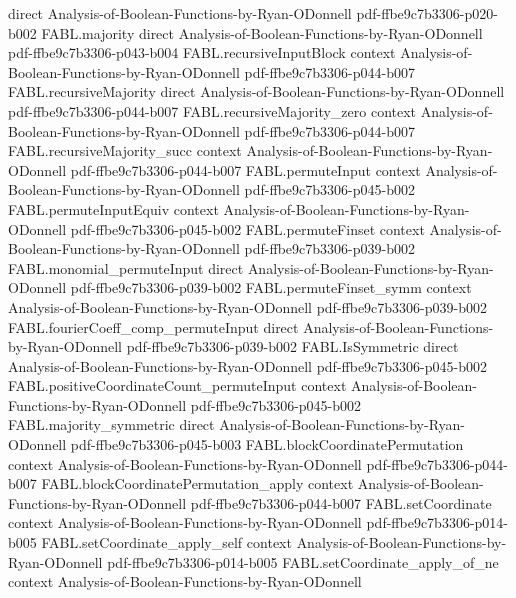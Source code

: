 \begin{theorem}
  {direct}
  {Analysis-of-Boolean-Functions-by-Ryan-ODonnell}
  {pdf-ffbe9c7b3306-p020-b002}
\proofstep
  {FABL.majority}
  {direct}
  {Analysis-of-Boolean-Functions-by-Ryan-ODonnell}
  {pdf-ffbe9c7b3306-p043-b004}
\proofstep
  {FABL.recursiveInputBlock}
  {context}
  {Analysis-of-Boolean-Functions-by-Ryan-ODonnell}
  {pdf-ffbe9c7b3306-p044-b007}
\proofstep
  {FABL.recursiveMajority}
  {direct}
  {Analysis-of-Boolean-Functions-by-Ryan-ODonnell}
  {pdf-ffbe9c7b3306-p044-b007}
\proofstep
  {FABL.recursiveMajority_zero}
  {context}
  {Analysis-of-Boolean-Functions-by-Ryan-ODonnell}
  {pdf-ffbe9c7b3306-p044-b007}
\proofstep
  {FABL.recursiveMajority_succ}
  {context}
  {Analysis-of-Boolean-Functions-by-Ryan-ODonnell}
  {pdf-ffbe9c7b3306-p044-b007}
\proofstep
  {FABL.permuteInput}
  {context}
  {Analysis-of-Boolean-Functions-by-Ryan-ODonnell}
  {pdf-ffbe9c7b3306-p045-b002}
\proofstep
  {FABL.permuteInputEquiv}
  {context}
  {Analysis-of-Boolean-Functions-by-Ryan-ODonnell}
  {pdf-ffbe9c7b3306-p045-b002}
\proofstep
  {FABL.permuteFinset}
  {context}
  {Analysis-of-Boolean-Functions-by-Ryan-ODonnell}
  {pdf-ffbe9c7b3306-p039-b002}
\proofstep
  {FABL.monomial_permuteInput}
  {direct}
  {Analysis-of-Boolean-Functions-by-Ryan-ODonnell}
  {pdf-ffbe9c7b3306-p039-b002}
\proofstep
  {FABL.permuteFinset_symm}
  {context}
  {Analysis-of-Boolean-Functions-by-Ryan-ODonnell}
  {pdf-ffbe9c7b3306-p039-b002}
\proofstep
  {FABL.fourierCoeff_comp_permuteInput}
  {direct}
  {Analysis-of-Boolean-Functions-by-Ryan-ODonnell}
  {pdf-ffbe9c7b3306-p039-b002}
\proofstep
  {FABL.IsSymmetric}
  {direct}
  {Analysis-of-Boolean-Functions-by-Ryan-ODonnell}
  {pdf-ffbe9c7b3306-p045-b002}
\proofstep
  {FABL.positiveCoordinateCount_permuteInput}
  {context}
  {Analysis-of-Boolean-Functions-by-Ryan-ODonnell}
  {pdf-ffbe9c7b3306-p045-b002}
\proofstep
  {FABL.majority_symmetric}
  {direct}
  {Analysis-of-Boolean-Functions-by-Ryan-ODonnell}
  {pdf-ffbe9c7b3306-p045-b003}
\proofstep
  {FABL.blockCoordinatePermutation}
  {context}
  {Analysis-of-Boolean-Functions-by-Ryan-ODonnell}
  {pdf-ffbe9c7b3306-p044-b007}
\proofstep
  {FABL.blockCoordinatePermutation_apply}
  {context}
  {Analysis-of-Boolean-Functions-by-Ryan-ODonnell}
  {pdf-ffbe9c7b3306-p044-b007}
\proofstep
  {FABL.setCoordinate}
  {context}
  {Analysis-of-Boolean-Functions-by-Ryan-ODonnell}
  {pdf-ffbe9c7b3306-p014-b005}
\proofstep
  {FABL.setCoordinate_apply_self}
  {context}
  {Analysis-of-Boolean-Functions-by-Ryan-ODonnell}
  {pdf-ffbe9c7b3306-p014-b005}
\proofstep
  {FABL.setCoordinate_apply_of_ne}
  {context}
  {Analysis-of-Boolean-Functions-by-Ryan-ODonnell}

\end{theorem}
